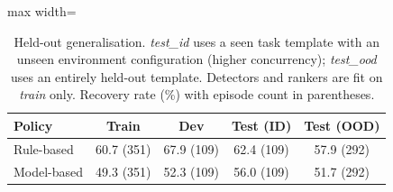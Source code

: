 \begin{table}[t]
\centering\small
\caption{Held-out generalisation. \emph{test\_id} uses a seen task template
with an unseen environment configuration (higher concurrency); \emph{test\_ood}
uses an entirely held-out template. Detectors and rankers are fit on
\emph{train} only. Recovery rate (\%) with episode count in parentheses.}
\label{tab:split}
\begin{adjustbox}{max width=\textwidth}
\begin{tabular}{@{}lcccc@{}}
\toprule
Policy & Train & Dev & Test (ID) & Test (OOD) \\
\midrule
Rule-based & 60.7 (351) & 67.9 (109) & 62.4 (109) & 57.9 (292) \\
Model-based & 49.3 (351) & 52.3 (109) & 56.0 (109) & 51.7 (292) \\
\bottomrule
\end{tabular}
\end{adjustbox}
\end{table}
